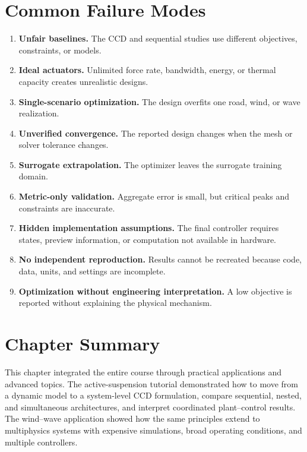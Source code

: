 \documentclass[11pt]{article}
\begin{document}
\section{Common Failure Modes}

\begin{enumerate}[leftmargin=1.5em]
  \item \textbf{Unfair baselines.} The CCD and sequential studies use different objectives, constraints, or models.
  \item \textbf{Ideal actuators.} Unlimited force rate, bandwidth, energy, or thermal capacity creates unrealistic designs.
  \item \textbf{Single-scenario optimization.} The design overfits one road, wind, or wave realization.
  \item \textbf{Unverified convergence.} The reported design changes when the mesh or solver tolerance changes.
  \item \textbf{Surrogate extrapolation.} The optimizer leaves the surrogate training domain.
  \item \textbf{Metric-only validation.} Aggregate error is small, but critical peaks and constraints are inaccurate.
  \item \textbf{Hidden implementation assumptions.} The final controller requires states, preview information, or computation not available in hardware.
  \item \textbf{No independent reproduction.} Results cannot be recreated because code, data, units, and settings are incomplete.
  \item \textbf{Optimization without engineering interpretation.} A low objective is reported without explaining the physical mechanism.
\end{enumerate}

\section{Chapter Summary}

This chapter integrated the entire course through practical applications and advanced topics. The active-suspension tutorial demonstrated how to move from a dynamic model to a system-level CCD formulation, compare sequential, nested, and simultaneous architectures, and interpret coordinated plant--control results. The wind--wave application showed how the same principles extend to multiphysics systems with expensive simulations, broad operating conditions, and multiple controllers.
\end{document}

